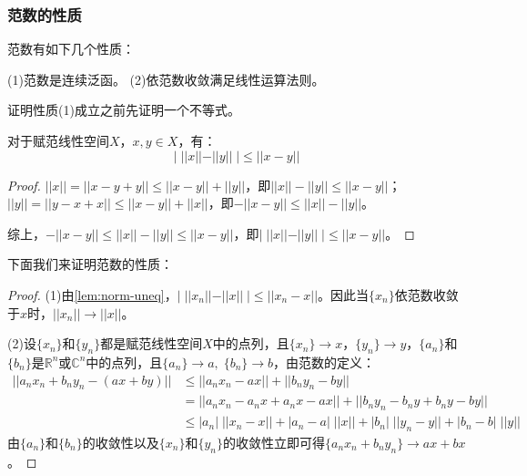 \subsubsection{范数的性质}
范数有如下几个性质：
\begin{property}
	(1)范数是连续泛函。
	(2)依范数收敛满足线性运算法则。 
\end{property}
证明性质(1)成立之前先证明一个不等式。
\begin{lemma}\label{lem:norm-uneq}
	对于赋范线性空间$X$，$x,y\in X$，有：
	\begin{equation*}
		|\;||x||-||y||\;|\leqslant||x-y||
	\end{equation*}
\end{lemma}
\begin{proof}
	$||x||=||x-y+y||\leqslant||x-y||+||y||$，即$||x||-||y||\leqslant||x-y||$；$||y||=||y-x+x||\leqslant||x-y||+||x||$，即$-||x-y||\leqslant||x||-||y||$。\par
	综上，$-||x-y||\leqslant||x||-||y||\leqslant||x-y||$，即$|\;||x||-||y||\;|\leqslant||x-y||$。
\end{proof}
下面我们来证明范数的性质：
\begin{proof}
	(1)由\cref{lem:norm-uneq}，$|\;||x_n||-||x||\;|\leqslant||x_n-x||$。因此当$\{x_n\}$依范数收敛于$x$时，$||x_n||\rightarrow||x||$。\par
	(2)设$\{x_n\}$和$\{y_n\}$都是赋范线性空间$X$中的点列，且$\{x_n\}\rightarrow x$，$\{y_n\}\rightarrow y$，$\{a_n\}$和$\{b_n\}$是$\mathbb{R}^{n}$或$\mathbb{C}^{n}$中的点列，且$\{a_n\}\to a,\;\{b_n\}\to b$，由范数的定义：
	\begin{align*}
		||a_nx_n+b_ny_n-(ax+by)||
		&\leqslant||a_nx_n-ax||+||b_ny_n-by|| \\
		&=||a_nx_n-a_nx+a_nx-ax||+||b_ny_n-b_ny+b_ny-by|| \\
		&\leqslant|a_n|\;||x_n-x||+|a_n-a|\;||x||+|b_n|\;||y_n-y||+|b_n-b|\;||y||
	\end{align*}
	由$\{a_n\}$和$\{b_n\}$的收敛性以及$\{x_n\}$和$\{y_n\}$的收敛性立即可得$\{a_nx_n+b_ny_n\}\to ax+bx$。
\end{proof}
